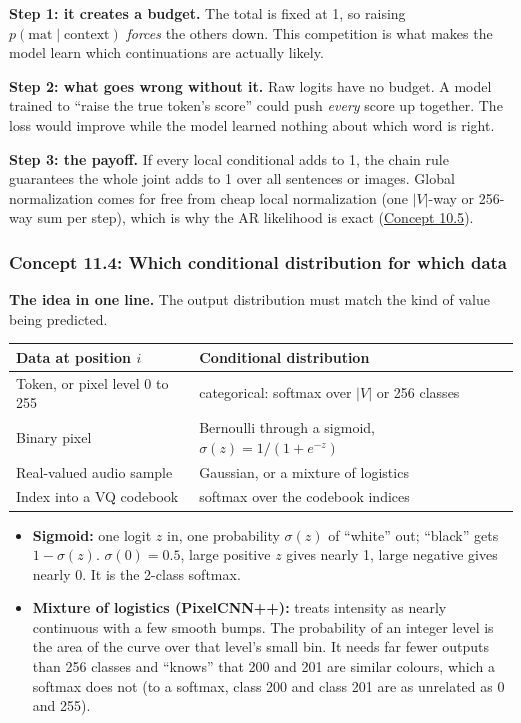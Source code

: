 \documentclass[12pt,a4paper]{article}
\begin{document}
\textbf{Step 1: it creates a budget.} The total is fixed at 1, so raising $p(\text{mat}\mid\text{context})$ \emph{forces} the others down. This competition is what makes the model learn which continuations are actually likely.

\textbf{Step 2: what goes wrong without it.} Raw logits have no budget. A model trained to ``raise the true token's score'' could push \emph{every} score up together. The loss would improve while the model learned nothing about which word is right.

\textbf{Step 3: the payoff.} If every local conditional adds to 1, the chain rule guarantees the whole joint adds to 1 over all sentences or images. Global normalization comes for free from cheap local normalization (one $|V|$-way or 256-way sum per step), which is why the AR likelihood is exact (\hyperref[c10-5]{Concept 10.5}).

\subsubsection{Concept 11.4: Which conditional distribution for which data}\label{c11-4}

\textbf{The idea in one line.} The output distribution must match the kind of value being predicted.
\begin{center}
\begin{tabular}{@{}>{\raggedright\arraybackslash}p{}>{\raggedright\arraybackslash}p{}@{}}
\toprule
Data at position $i$ & Conditional distribution \\
\midrule
Token, or pixel level 0 to 255 & categorical: softmax over $|V|$ or 256 classes \\
Binary pixel & Bernoulli through a sigmoid, $\sigma(z)=1/(1+e^{-z})$ \\
Real-valued audio sample & Gaussian, or a mixture of logistics \\
Index into a VQ codebook & softmax over the codebook indices \\
\bottomrule
\end{tabular}
\end{center}
\begin{itemize}[nosep]
  \item \textbf{Sigmoid:} one logit $z$ in, one probability $\sigma(z)$ of ``white'' out; ``black'' gets $1-\sigma(z)$. $\sigma(0)=0.5$, large positive $z$ gives nearly 1, large negative gives nearly 0. It is the 2-class softmax.
  \item \textbf{Mixture of logistics (PixelCNN++):} treats intensity as nearly continuous with a few smooth bumps. The probability of an integer level is the area of the curve over that level's small bin. It needs far fewer outputs than 256 classes and ``knows'' that 200 and 201 are similar colours, which a softmax does not (to a softmax, class 200 and class 201 are as unrelated as 0 and 255).
\end{itemize}
\end{document}
